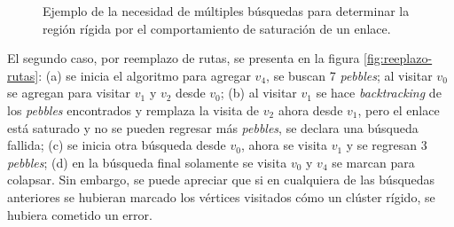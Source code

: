 \begin{figure}
\begin{subfigure}{0.48\textwidth}
\caption{}
\end{subfigure}
\hfill
\begin{subfigure}{0.48\textwidth}
\centering
{}
\caption{}
\end{subfigure}
\caption{Ejemplo de la necesidad de múltiples búsquedas para determinar la región rígida por el comportamiento de saturación de un enlace.}
\label{fig:saturacion-enlace}
\end{figure}

El segundo caso, por reemplazo de rutas, se presenta en la figura \ref{fig:reeplazo-rutas}: (a) se inicia el algoritmo para agregar $v_4$, se buscan 7 \emph{pebbles}; al visitar $v_0$ se agregan para visitar $v_1$ y $v_2$ desde $v_0$; (b) al visitar $v_1$ se hace \emph{backtracking} de los \emph{pebbles} encontrados y remplaza la visita de $v_2$ ahora desde $v_1$, pero el enlace está saturado y no se pueden regresar más \emph{pebbles}, se declara una búsqueda fallida; (c) se inicia otra búsqueda desde $v_0$, ahora se visita $v_1$ y se regresan 3 \emph{pebbles}; (d) en la búsqueda final solamente se visita $v_0$ y $v_4$ se marcan para colapsar. Sin embargo, se puede apreciar que si en cualquiera de las búsquedas anteriores se hubieran marcado los vértices visitados cómo un clúster rígido, se hubiera cometido un error.

